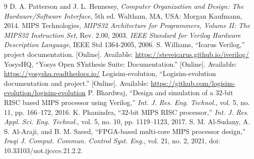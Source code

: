 \documentclass[conference]{IEEEtran}
\begin{document}
\begin{thebibliography}{9}
 D. A. Patterson and J. L. Hennessy, \emph{Computer Organization and Design: The Hardware/Software Interface}, 5th ed. Waltham, MA, USA: Morgan Kaufmann, 2014.
 MIPS Technologies, \emph{MIPS32 Architecture for Programmers, Volume II: The MIPS32 Instruction Set}, Rev. 2.00, 2003.
 \emph{IEEE Standard for Verilog Hardware Description Language}, IEEE Std 1364-2005, 2006.
 S. Williams, ``Icarus Verilog,'' project documentation. [Online]. Available: \url{https://steveicarus.github.io/iverilog/}
 YosysHQ, ``Yosys Open SYnthesis Suite: Documentation.'' [Online]. Available: \url{https://yosyshq.readthedocs.io/}
 Logisim-evolution, ``Logisim-evolution documentation and project.'' [Online]. Available: \url{https://github.com/logisim-evolution/logisim-evolution}
 P. Bhardwaj, ``Design and simulation of a 32-bit RISC based MIPS processor using Verilog,'' \emph{Int. J. Res. Eng. Technol.}, vol. 5, no. 11, pp. 166--172, 2016.
 K. Phanindra, ``32-bit MIPS RISC processor,'' \emph{Int. J. Res. Appl. Sci. Eng. Technol.}, vol. 5, no. 10, pp. 1119--1123, 2017.
 S. M. Al-Sudany, A. S. Al-Araji, and B. M. Saeed, ``FPGA-based multi-core MIPS processor design,'' \emph{Iraqi J. Comput. Commun. Control Syst. Eng.}, vol. 21, no. 2, 2021, doi: 10.33103/uot.ijccce.21.2.2.
\end{thebibliography}
\end{document}
